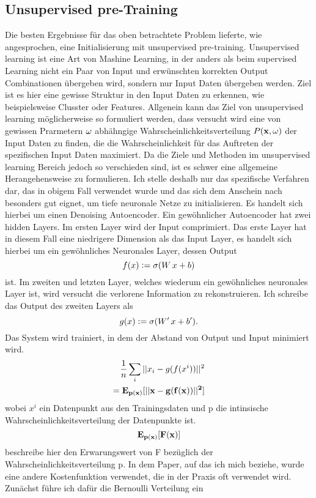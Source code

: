 \documentclass[12pt]{article}
\begin{document}
\subsection*{Unsupervised pre-Training}
Die besten Ergebnisse für das oben betrachtete Problem lieferte, wie angesprochen, eine Initialisierung mit unsupervised pre-training. Unsupervised learning ist eine Art von Mashine Learning, in der anders als beim supervised Learning nicht ein Paar von Input und erwünschten korrekten Output Combinationen übergeben wird, sondern nur Input Daten übergeben werden. Ziel ist es hier eine gewisse Struktur in den Input Daten zu erkennen, wie beispielsweise Clusster oder Features. Allgenein kann das Ziel von unsupervised learning möglicherweise so formuliert werden, dass versucht wird eine von gewissen Prarmetern $\bf{\omega}$ abhähngige Wahrscheinlichkeitsverteilung $P(\bf{x},\bf{\omega})$ der Input Daten zu finden, die die Wahrscheinlichkeit für das Auftreten der spezifischen Input Daten maximiert.\newline
Da die Ziele und Methoden im unsupervised learning Bereich jedoch so verschieden sind, ist es schwer eine allgemeine Herangehensweise zu formulieren. Ich stelle deshalb nur das spezifische Verfahren dar, das in obigem Fall verwendet wurde und das sich dem Anschein nach besonders gut eignet, um tiefe neuronale Netze zu initialisieren. Es handelt sich hierbei um einen Denoising Autoencoder. Ein gewöhnlicher Autoencoder hat zwei hidden Layers. Im ersten Layer wird der Input comprimiert. Das erste Layer hat in diesem Fall eine niedrigere Dimension als das Input Layer, es handelt sich hierbei um ein gewöhnliches Neuronales Layer, dessen Output
$$f(x)\vcentcolon=\sigma(W\,x+b)$$
ist. Im zweiten und letzten Layer, welches wiederum ein gewöhnliches neuronales Layer ist, wird versucht die verlorene Information zu rekonstruieren. Ich schreibe das Output des zweiten Layers als
$$g(x)\vcentcolon=\sigma(W'\,x+b').$$
Das System wird trainiert, in dem der Abstand von Output und Input minimiert wird.
\begin{align*}\frac{1}{n}\sum_i||x_i-g(f(x^i))||^2\\
    =\bf{E}_{p(x)}[||x-g(f(x))||^2]
\end{align*}
wobei $x^i$ ein Datenpunkt aus den Trainingsdaten und p die intinsische Wahrscheinlichkeitsverteilung der Datenpunkte ist. 
$$\bf{E}_{p(x)}[F(x)]$$
beschreibe hier den Erwarungswert von F bezüglich der Wahrscheinlichkeitsverteilung p. In dem Paper, auf das ich mich beziehe, wurde eine andere Kostenfunktion verwendet, die in der Praxis oft verwendet wird. Zunächst führe ich dafür die Bernoulli Verteilung ein
\end{document}
